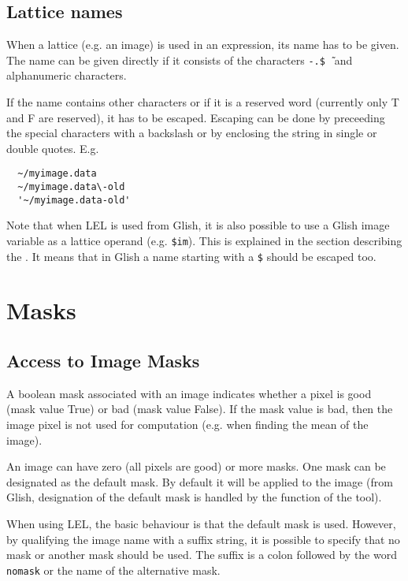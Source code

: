 \subsection{\label{LEL:LATTICES}Lattice names}

When a lattice (e.g.  an image) is used in an expression, its name has
to be given.  The name can be given directly if it consists of the
characters \texttt{-}\texttt{.}\texttt{\$}\texttt{\~\ } and alphanumeric
characters. 

\medskip\noindent If the name contains other characters or if it is a reserved word
(currently only T and F are reserved), it has to be escaped.  Escaping
can be done by preceeding the special characters with a backslash or by
enclosing the string in single or double quotes.  E.g. 

\begin{verbatim}
  ~/myimage.data
  ~/myimage.data\-old
  '~/myimage.data-old'
\end{verbatim}

\medskip\noindent Note that when LEL is used from Glish, it is also possible to use
a Glish image variable as a lattice operand (e.g. \texttt{\$im}).
This is explained in the section describing the
. It means that in Glish a
name starting with a \texttt{\$} should be escaped too.


\section{\label{LEL:MASKS}Masks}

\subsection{Access to Image Masks}

A boolean mask associated with an image indicates whether a pixel is
good (mask value True) or bad (mask value False).  If the mask value is
bad, then the image pixel is not used for computation (e.g.  when
finding the mean of the image). 

\medskip\noindent An image can have zero (all pixels are good) or more masks.  One mask
can be designated as the default mask.  By default it will be applied to
the image (from Glish, designation of the default mask is handled by the
 function
of the  tool).

\medskip\noindent When using LEL, the basic behaviour is that the default mask is used. 
However, by qualifying the image name with a suffix string, it is
possible to specify that no mask or another mask should be used.  The suffix
is a colon followed by the word \texttt{nomask} or the name of the
alternative mask.

